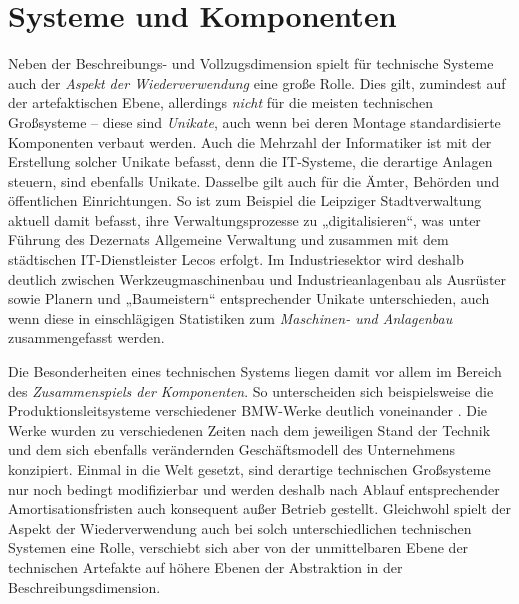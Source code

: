 \documentclass[11pt,a4paper]{article}
\begin{document}
\section{Systeme und Komponenten}

Neben der Beschreibungs- und Vollzugsdimension spielt für technische Systeme
auch der \emph{Aspekt der Wiederverwendung} eine große Rolle.  Dies gilt,
zumindest auf der artefaktischen Ebene, allerdings \emph{nicht} für die
meisten technischen Großsysteme -- diese sind \emph{Unikate}, auch wenn bei
deren Montage standardisierte Komponenten verbaut werden. Auch die Mehrzahl
der Informatiker ist mit der Erstellung solcher Unikate befasst, denn die
IT-Systeme, die derartige Anlagen steuern, sind ebenfalls Unikate.  Dasselbe
gilt auch für die Ämter, Behörden und öffentlichen Einrichtungen. So ist zum
Beispiel die Leipziger Stadtverwaltung aktuell damit befasst, ihre
Verwaltungsprozesse zu „digitalisieren“, was unter Führung des Dezernats
Allgemeine Verwaltung und zusammen mit dem städtischen IT-Dienstleister Lecos
erfolgt. Im Industriesektor wird deshalb deutlich zwischen
Werkzeugmaschinenbau und Industrieanlagenbau als Ausrüster sowie Planern und
„Baumeistern“ entsprechender Unikate unterschieden, auch wenn diese in
einschlägigen Statistiken \cite{VDMA2019} zum \emph{Maschinen- und Anlagenbau}
zusammengefasst werden.

Die Besonderheiten eines technischen Systems liegen damit vor allem im Bereich
des \emph{Zusammenspiels der Komponenten}. So unterscheiden sich
beispielsweise die Produktionsleitsysteme verschiedener BMW-Werke deutlich
voneinander \cite{Kropik2009}. Die Werke wurden zu verschiedenen Zeiten nach
dem jeweiligen Stand der Technik und dem sich ebenfalls verändernden
Geschäftsmodell des Unternehmens konzipiert. Einmal in die Welt gesetzt, sind
derartige technischen Großsysteme nur noch bedingt modifizierbar und werden
deshalb nach Ablauf entsprechender Amortisationsfristen auch konsequent außer
Betrieb gestellt. Gleichwohl spielt der Aspekt der Wiederverwendung auch bei
solch unterschiedlichen technischen Systemen eine Rolle, verschiebt sich aber
von der unmittelbaren Ebene der technischen Artefakte auf höhere Ebenen der
Abstraktion in der Beschreibungsdimension.
\end{document}
